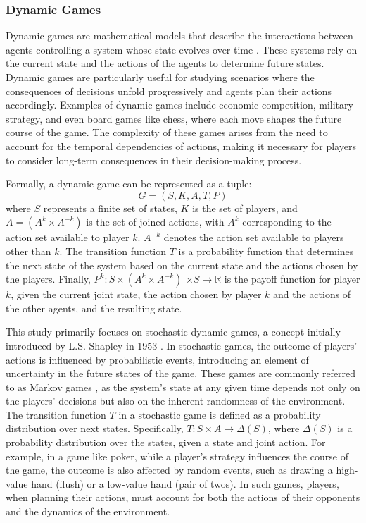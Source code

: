     \subsubsection{Dynamic Games}

        Dynamic games are mathematical models that describe the interactions between agents controlling a system whose state evolves over time \cite{dynamicgames/krawczyk-jacek}. These systems rely on the current state and the actions of the agents to determine future states. Dynamic games are particularly useful for studying scenarios where the consequences of decisions unfold progressively and agents plan their actions accordingly. Examples of dynamic games include economic competition, military strategy, and even board games like chess, where each move shapes the future course of the game. The complexity of these games arises from the need to account for the temporal dependencies of actions, making it necessary for players to consider long-term consequences in their decision-making process.\tinydouble

        \noindent
        Formally, a dynamic game can be represented as a tuple:
        \begin{equation}
            G = (S, K, A, T, P)
            \label{eq:dyngame}
        \end{equation}
        where $S$ represents a finite set of states, $K$ is the set of players, and $A = (A^k \times A^{-k})$ is the set of joined actions, with $A^k$ corresponding to the action set available to player $k$. $A^{-k}$ denotes the action set available to players other than $k$. The transition function $T$ is a probability function that determines the next state of the system based on the current state and the actions chosen by the players. Finally, $P^k: S \times (A^k \times A^{-k})$ \allowbreak $\times S \to \mathbb{R}$ is the payoff function for player $k$, given the current joint state, the action chosen by player $k$ and the actions of the other agents, and the resulting state.\tinydouble

        \noindent
        This study primarily focuses on stochastic dynamic games, a concept initially introduced by L.S. Shapley in 1953 \cite{Shapley1953StochasticG}. In stochastic games, the outcome of players' actions is influenced by probabilistic events, introducing an element of uncertainty in the future states of the game. These games are commonly referred to as Markov games \cite{Shoham_Leyton-Brown_2008}, as the system's state at any given time depends not only on the players' decisions but also on the inherent randomness of the environment. The transition function $T$ in a stochastic game is defined as a probability distribution over next states. Specifically, $T: S \times A \to \Delta(S)$, where $\Delta(S)$ is a probability distribution over the states, given a state and joint action. For example, in a game like poker, while a player's strategy influences the course of the game, the outcome is also affected by random events, such as drawing a high-value hand (flush) or a low-value hand (pair of twos). In such games, players, when planning their actions, must account for both the actions of their opponents and the dynamics of the environment.\tinydouble

